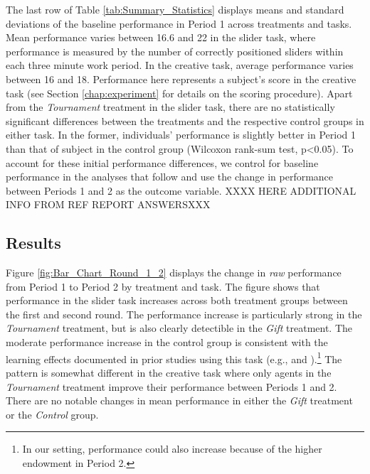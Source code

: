 The last row of Table \ref{tab:Summary_Statistics} displays means and standard
 deviations of the baseline performance in  Period 1 across treatments and tasks. 
Mean performance varies between 16.6 and 22 in the slider task, where 
performance is measured by the number of  correctly positioned sliders within
 each three minute work period. In the creative task, average performance varies 
between 16 and 18. Performance here represents a subject's score 
in the creative task (see Section \ref{chap:experiment} for details on the scoring procedure). 
Apart from the \textit{Tournament} 
treatment in the slider task, there are no statistically significant differences between the treatments and the respective
 control groups in either task. In the former, individuals' performance is slightly better in 
Period 1 than that of subject in the control group (Wilcoxon rank-sum test, p<0.05). 
To account for these initial performance differences, we control for baseline
 performance in the analyses that follow and use the change 
in performance between Periods 1 and 2 as the outcome variable. XXXX HERE ADDITIONAL INFO FROM REF REPORT ANSWERSXXX

\subsection{Results}\label{chap:main_analyses}

Figure \ref{fig:Bar_Chart_Round_1_2} displays the change in 
\textit{raw} performance from Period 1 to Period 2 by treatment and task. 
The figure shows that performance in the slider task increases across both  treatment groups between the first and second round. The performance increase is particularly strong in the \textit{Tournament} treatment, but is also clearly detectible in the \textit{Gift} treatment.
The moderate performance increase in the control group is consistent with the learning effects documented in prior studies using this task (e.g., \cite{2012_Gill_Prowse} and \cite{Araujo2016}).\footnote{In our setting, performance could also increase because of the higher endowment in Period 2.} 
The pattern is somewhat different in the creative task where 
only agents in the \textit{Tournament} treatment improve their performance 
between Periods 1 and 2. There are no notable changes in mean performance in either the \textit{Gift} treatment 
or the \textit{Control} group. 

